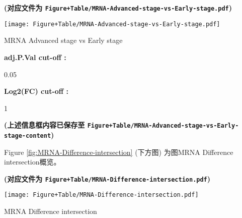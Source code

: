 \documentclass[
]{article}
\begin{document}
\textbf{(对应文件为 \texttt{Figure+Table/MRNA-Advanced-stage-vs-Early-stage.pdf})}

\def\@captype{figure}
\begin{center}
\texttt{[image: Figure+Table/MRNA-Advanced-stage-vs-Early-stage.pdf]}
\caption{MRNA Advanced stage vs Early stage}\label{fig:MRNA-Advanced-stage-vs-Early-stage}
\end{center}

\begin{center}\vspace{1.5cm}\end{center}\begin{center}\begin{tcolorbox}[colback=gray!10, colframe=gray!50, width=0.9\linewidth, arc=1mm, boxrule=0.5pt]
\textbf{
adj.P.Val cut-off
:}

\vspace{0.5em}

    0.05

\vspace{2em}


\textbf{
Log2(FC) cut-off
:}

\vspace{0.5em}

    1

\vspace{2em}
\end{tcolorbox}
\end{center}

\textbf{(上述信息框内容已保存至 \texttt{Figure+Table/MRNA-Advanced-stage-vs-Early-stage-content})}

\begin{center}\vspace{1.5cm}\end{center}

Figure \ref{fig:MRNA-Difference-intersection} (下方图) 为图MRNA Difference intersection概览。

\textbf{(对应文件为 \texttt{Figure+Table/MRNA-Difference-intersection.pdf})}

\def\@captype{figure}
\begin{center}
\texttt{[image: Figure+Table/MRNA-Difference-intersection.pdf]}
\caption{MRNA Difference intersection}\label{fig:MRNA-Difference-intersection}
\end{center}
\end{document}
